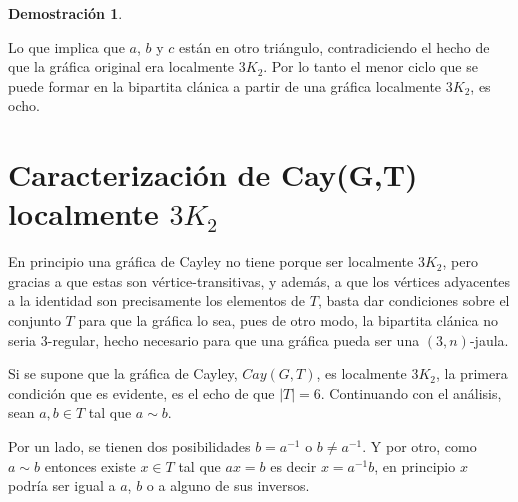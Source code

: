 \documentclass[12pt]{book}
\theoremstyle{definition}
\newtheorem{demostration}{Demostración}
\begin{document}
\begin{demostration}
\begin{figure}[htb]
  \centering
  \caption{} \label{triancontriang}
\end{figure}

Lo que implica que $a$, $b$ y $c$ están en otro triángulo,
contradiciendo el hecho de que la gráfica original era localmente
$3K_2$. Por lo tanto el menor ciclo que se puede formar en la
bipartita clánica a partir de una gráfica localmente $3K_2$, es ocho.
\end{demostration}



\newpage

\section {Caracterización de Cay(G,T) localmente $3K_2$}



En principio una gráfica de Cayley no tiene porque ser localmente
$3K_2$, pero gracias a que estas son vértice-transitivas, y además, a
que los vértices adyacentes a la identidad son precisamente los
elementos de $T$, basta dar condiciones sobre el conjunto $T$ para que
la gráfica lo sea, pues de otro modo, la bipartita clánica no seria
$3$-regular, hecho necesario para que una gráfica pueda ser una
$(3,n)$-jaula.



Si se supone que la gráfica de Cayley, $Cay(G, T)$, es localmente
$3K_2$, la primera condición que es evidente, es el echo de que
$|T|=6$. Continuando con el análisis, sean $a, b \in T$ tal que $a
\sim b$.

Por un lado, se tienen dos posibilidades $b= a^{-1}$ o $b\neq
a^{-1}$. Y por otro, como $a\sim b$ entonces existe $x\in T$ tal que
$ax=b$ es decir $x=a^{-1}b$, en principio $x$ podría ser igual a $a$,
$b$ o a alguno de sus inversos.

\end{document}
